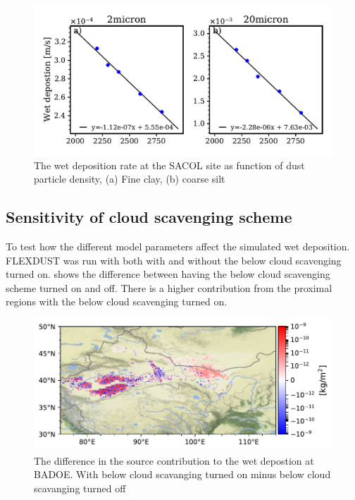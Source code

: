 \begin{figure}[hptb]
    \centering
    \includegraphics[width=\textwidth]{texfiles/figs/wetdep_function_of_density.pdf}
    \caption{The wet deposition rate at the SACOL site as function of dust particle density, (a) Fine clay, (b) coarse silt}
    \label{fig:wet_dep_density}
\end{figure}

\subsection{Sensitivity of cloud scavenging scheme}\label{wet:dep_sensitivty}
To test how the different model parameters affect the simulated wet deposition. FLEXDUST was run with both with and without the below cloud scavenging turned on.  shows the difference between having the below cloud scavenging scheme turned on and off. There is a higher contribution from the proximal regions with the below cloud scavenging turned on.  
\begin{figure}[htbp]
    \centering
    \includegraphics[width=\textwidth]{texfiles/figs/no_scav_test.pdf}
    \caption{The difference in the source contribution to the wet depostion at BADOE. With below cloud scavanging turned on minus below cloud scavanging turned off}
    \label{fig:scav_sensitivty}
\end{figure}

